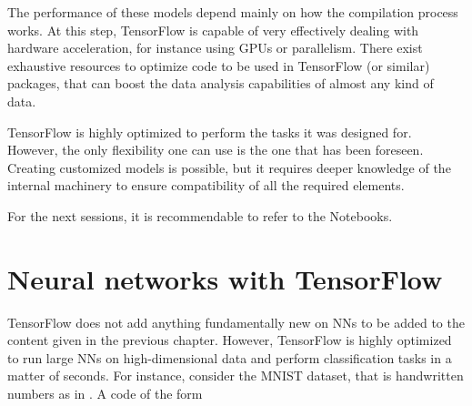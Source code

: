 \documentclass[]{report}
\begin{document}
The performance of these models depend mainly on how the compilation process works. At this step, TensorFlow is capable of very effectively dealing with hardware acceleration, for instance using GPUs or parallelism. There exist exhaustive resources to optimize code to be used in TensorFlow (or similar) packages, that can boost the data analysis capabilities of almost any kind of data. 

TensorFlow is highly optimized to perform the tasks it was designed for. However, the only flexibility one can use is the one that has been foreseen. Creating customized models is possible, but it requires deeper knowledge of the internal machinery to ensure compatibility of all the required elements. 

For the next sessions, it is recommendable to refer to the Notebooks. 

\section{Neural networks with TensorFlow}

TensorFlow does not add anything fundamentally new on NNs to be added to the content given in the previous chapter. However, TensorFlow is highly optimized to run large NNs on high-dimensional data and perform classification tasks in a matter of seconds. For instance, consider the MNIST dataset, that is handwritten numbers as in . A code of the form
\vskip5mm
\end{document}

